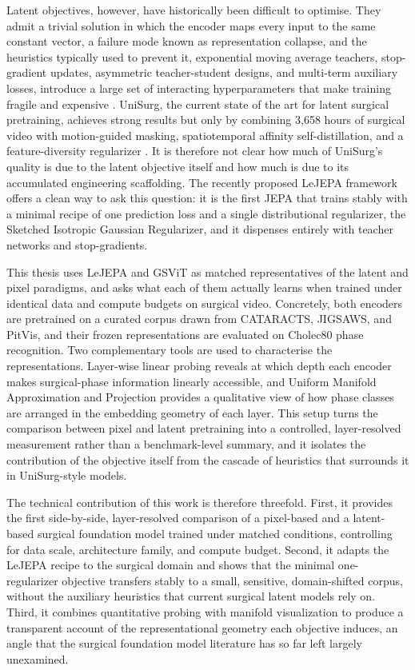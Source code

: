 \documentclass[11pt, a4paper]{article}
\begin{document}
Latent objectives, however, have historically been difficult to optimise. They admit a trivial solution in which the encoder maps every input to the same constant vector, a failure mode known as representation collapse, and the heuristics typically used to prevent it, exponential moving average teachers, stop-gradient updates, asymmetric teacher-student designs, and multi-term auxiliary losses, introduce a large set of interacting hyperparameters that make training fragile and expensive \parencite{wagner-2022, maes-2026}. UniSurg, the current state of the art for latent surgical pretraining, achieves strong results but only by combining 3,658 hours of surgical video with motion-guided masking, spatiotemporal affinity self-distillation, and a feature-diversity regularizer \parencite{wu-2026}. It is therefore not clear how much of UniSurg's quality is due to the latent objective itself and how much is due to its accumulated engineering scaffolding. The recently proposed LeJEPA framework \parencite{balestriero-2025} offers a clean way to ask this question: it is the first JEPA that trains stably with a minimal recipe of one prediction loss and a single distributional regularizer, the Sketched Isotropic Gaussian Regularizer, and it dispenses entirely with teacher networks and stop-gradients.

This thesis uses LeJEPA and GSViT as matched representatives of the latent and pixel paradigms, and asks what each of them actually learns when trained under identical data and compute budgets on surgical video. Concretely, both encoders are pretrained on a curated corpus drawn from CATARACTS, JIGSAWS, and PitVis, and their frozen representations are evaluated on Cholec80 phase recognition. Two complementary tools are used to characterise the representations. Layer-wise linear probing reveals at which depth each encoder makes surgical-phase information linearly accessible, and Uniform Manifold Approximation and Projection \parencite{mcinnes-2018} provides a qualitative view of how phase classes are arranged in the embedding geometry of each layer. This setup turns the comparison between pixel and latent pretraining into a controlled, layer-resolved measurement rather than a benchmark-level summary, and it isolates the contribution of the objective itself from the cascade of heuristics that surrounds it in UniSurg-style models.

The technical contribution of this work is therefore threefold. First, it provides the first side-by-side, layer-resolved comparison of a pixel-based and a latent-based surgical foundation model trained under matched conditions, controlling for data scale, architecture family, and compute budget. Second, it adapts the LeJEPA recipe to the surgical domain and shows that the minimal one-regularizer objective transfers stably to a small, sensitive, domain-shifted corpus, without the auxiliary heuristics that current surgical latent models rely on. Third, it combines quantitative probing with manifold visualization to produce a transparent account of the representational geometry each objective induces, an angle that the surgical foundation model literature has so far left largely unexamined.
\end{document}
